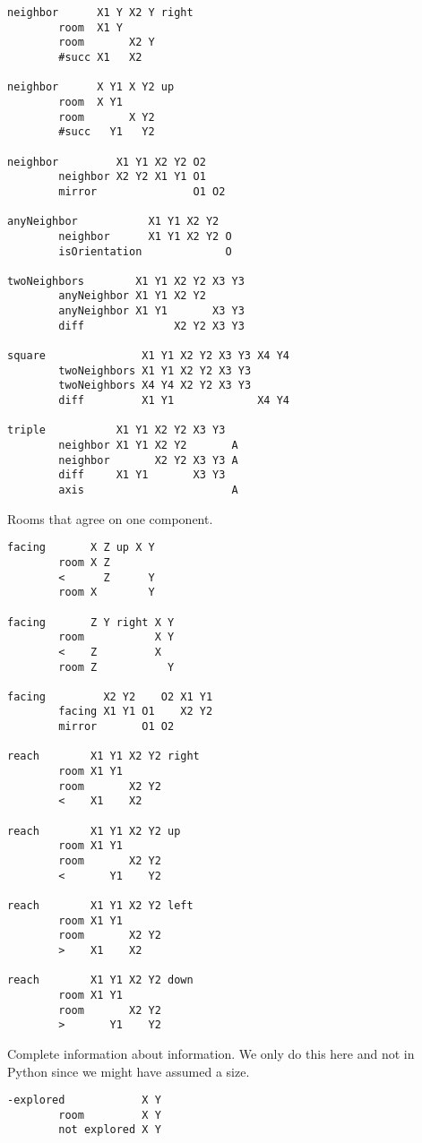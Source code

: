 \begin{verbatim}
neighbor      X1 Y X2 Y right
        room  X1 Y
        room       X2 Y
        #succ X1   X2

neighbor      X Y1 X Y2 up
        room  X Y1
        room       X Y2
        #succ   Y1   Y2

neighbor         X1 Y1 X2 Y2 O2
        neighbor X2 Y2 X1 Y1 O1
        mirror               O1 O2

anyNeighbor           X1 Y1 X2 Y2
        neighbor      X1 Y1 X2 Y2 O
        isOrientation             O

twoNeighbors        X1 Y1 X2 Y2 X3 Y3
        anyNeighbor X1 Y1 X2 Y2
        anyNeighbor X1 Y1       X3 Y3
        diff              X2 Y2 X3 Y3

square               X1 Y1 X2 Y2 X3 Y3 X4 Y4
        twoNeighbors X1 Y1 X2 Y2 X3 Y3
        twoNeighbors X4 Y4 X2 Y2 X3 Y3
        diff         X1 Y1             X4 Y4

triple           X1 Y1 X2 Y2 X3 Y3
        neighbor X1 Y1 X2 Y2       A
        neighbor       X2 Y2 X3 Y3 A
        diff     X1 Y1       X3 Y3
        axis                       A
\end{verbatim}

Rooms that agree on one component.

\begin{verbatim}
facing       X Z up X Y
        room X Z
        <      Z      Y
        room X        Y

facing       Z Y right X Y
        room           X Y
        <    Z         X
        room Z           Y

facing         X2 Y2    O2 X1 Y1
        facing X1 Y1 O1    X2 Y2
        mirror       O1 O2

reach        X1 Y1 X2 Y2 right
        room X1 Y1
        room       X2 Y2
        <    X1    X2

reach        X1 Y1 X2 Y2 up
        room X1 Y1
        room       X2 Y2
        <       Y1    Y2

reach        X1 Y1 X2 Y2 left
        room X1 Y1
        room       X2 Y2
        >    X1    X2

reach        X1 Y1 X2 Y2 down
        room X1 Y1
        room       X2 Y2
        >       Y1    Y2
\end{verbatim}

Complete information about information. We only do this here and not in
Python since we might have assumed a size.

\begin{verbatim}
-explored            X Y
        room         X Y
        not explored X Y
\end{verbatim}

